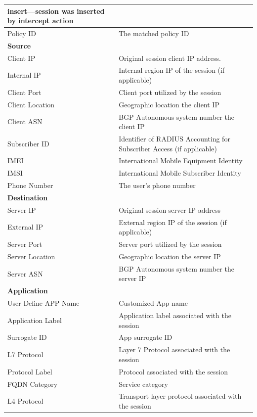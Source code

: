 \begin{longtable}{p{}|p{}}
                    insert—session was inserted by intercept action \\\hline
    Policy ID &	The matched policy ID \\\hline
    \multicolumn{2}{l}{\textbf{Source}} \\\hline
    Client IP &	Original session client IP address.  \\\hline
    Internal IP &	Internal region IP of the session (if applicable) \\\hline
    Client Port &	Client port utilized by the session  \\\hline
    Client Location &	Geographic location the client IP \\\hline
    Client ASN &	BGP Autonomous system number the client IP \\\hline
    Subscriber ID &	Identifier of RADIUS Accounting for Subscriber Access (if applicable) \\\hline
    IMEI &	International Mobile Equipment Identity \\\hline
    IMSI &	International Mobile Subscriber Identity  \\\hline
    Phone Number &	The user’s phone number  \\\hline
    \multicolumn{2}{l}{\textbf{Destination}} \\\hline
    Server IP &	Original session server IP address \\\hline
    External IP	& External region IP of the session (if applicable)\\\hline
    Server Port &	Server port utilized by the session\\\hline
    Server Location &	Geographic location the server IP\\\hline
    Server ASN &	BGP Autonomous system number the server IP\\\hline
    \multicolumn{2}{l}{\textbf{Application}} \\\hline
    User Define APP Name &	Customized App name \\\hline
    Application Label &	Application label associated with the session \\\hline
    Surrogate ID &	App surrogate ID \\\hline
    L7 Protocol &	Layer 7 Protocol associated with the session \\\hline
    Protocol Label &	Protocol associated with the session \\\hline
    FQDN Category &	Service category \\\hline
    L4 Protocol &	Transport layer protocol associated with the session \\\hline

\end{longtable}
